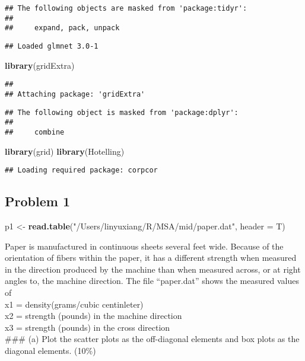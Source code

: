 \documentclass[]{article}
\newenvironment{Shaded}{\begin{snugshade}}{\end{snugshade}}
\newcommand{\DataTypeTok}[1]{\textcolor[rgb]{0.13,0.29,0.53}{#1}}
\newcommand{\KeywordTok}[1]{\textcolor[rgb]{0.13,0.29,0.53}{\textbf{#1}}}
\newcommand{\NormalTok}[1]{#1}
\newcommand{\StringTok}[1]{\textcolor[rgb]{0.31,0.60,0.02}{#1}}
\begin{document}
\begin{verbatim}
## The following objects are masked from 'package:tidyr':
## 
##     expand, pack, unpack
\end{verbatim}

\begin{verbatim}
## Loaded glmnet 3.0-1
\end{verbatim}

\begin{Shaded}
\begin{Highlighting}[]
\KeywordTok{library}\NormalTok{(gridExtra)}
\end{Highlighting}
\end{Shaded}

\begin{verbatim}
## 
## Attaching package: 'gridExtra'
\end{verbatim}

\begin{verbatim}
## The following object is masked from 'package:dplyr':
## 
##     combine
\end{verbatim}

\begin{Shaded}
\begin{Highlighting}[]
\KeywordTok{library}\NormalTok{(grid)}
\KeywordTok{library}\NormalTok{(Hotelling)}
\end{Highlighting}
\end{Shaded}

\begin{verbatim}
## Loading required package: corpcor
\end{verbatim}

\hypertarget{problem-1}{%
\subsection{Problem 1}\label{problem-1}}

\begin{Shaded}
\begin{Highlighting}[]
\NormalTok{p1 <-}\StringTok{ }\KeywordTok{read.table}\NormalTok{(}\StringTok{"/Users/linyuxiang/R/MSA/mid/paper.dat"}\NormalTok{, }\DataTypeTok{header =}\NormalTok{ T)}
\end{Highlighting}
\end{Shaded}

Paper is manufactured in continuous sheets several feet wide. Because of
the orientation of fibers within the paper, it has a different strength
when measured in the direction produced by the machine than when
measured across, or at right angles to, the machine direction. The file
``paper.dat'' shows the measured values of\\
x1 = density(grams/cubic centinleter)\\
x2 = strength (pounds) in the machine direction\\
x3 = strength (pounds) in the cross direction\\
\#\#\# (a) Plot the scatter plots as the off-diagonal elements and box
plots as the diagonal elements. (10\%)
\end{document}
